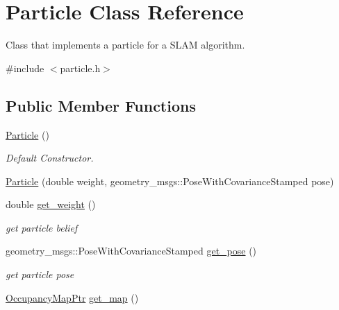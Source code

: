 \hypertarget{classParticle}{\section{Particle Class Reference}
\label{classParticle}
}


Class that implements a particle for a S\-L\-A\-M algorithm.  




{\ttfamily \#include $<$particle.\-h$>$}

\subsection*{Public Member Functions}
\begin{DoxyCompactItemize}
\item 
\hypertarget{classParticle_a40f4c7e248029d72e7714b7802d5e5e1}{\hyperlink{classParticle_a40f4c7e248029d72e7714b7802d5e5e1}{Particle} ()}\label{classParticle_a40f4c7e248029d72e7714b7802d5e5e1}

\begin{DoxyCompactList}\small\item\em Default Constructor. \end{DoxyCompactList}\item 
\hyperlink{classParticle_ada5f546ca4314231550c84f4c80f58f1}{Particle} (double weight, geometry\-\_\-msgs\-::\-Pose\-With\-Covariance\-Stamped pose)
\item 
\hypertarget{classParticle_a2be6a5d2890263085642eff4b168fbbf}{double \hyperlink{classParticle_a2be6a5d2890263085642eff4b168fbbf}{get\-\_\-weight} ()}\label{classParticle_a2be6a5d2890263085642eff4b168fbbf}

\begin{DoxyCompactList}\small\item\em get particle belief \end{DoxyCompactList}\item 
\hypertarget{classParticle_ab6d40cebe007ecf4b4a979920e5b6812}{geometry\-\_\-msgs\-::\-Pose\-With\-Covariance\-Stamped \hyperlink{classParticle_ab6d40cebe007ecf4b4a979920e5b6812}{get\-\_\-pose} ()}\label{classParticle_ab6d40cebe007ecf4b4a979920e5b6812}

\begin{DoxyCompactList}\small\item\em get particle pose \end{DoxyCompactList}\item 
\hypertarget{classParticle_a59175592f7420c93a4d3e89da546473b}{\hyperlink{occupancy__map_8h_aea86d1b633e7d9b44b660a39fa9b50f7}{Occupancy\-Map\-Ptr} \hyperlink{classParticle_a59175592f7420c93a4d3e89da546473b}{get\-\_\-map} ()}\label{classParticle_a59175592f7420c93a4d3e89da546473b}


\end{DoxyCompactItemize}
